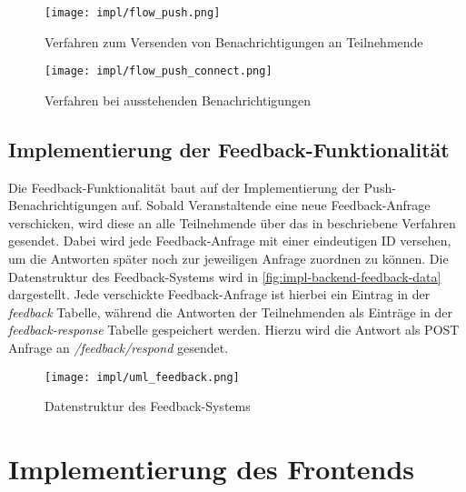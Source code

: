\begin{figure}[htpb]
    \centering
    \texttt{[image: impl/flow\_push.png]}
    \caption{Verfahren zum Versenden von Benachrichtigungen an Teilnehmende}
    \label{fig:impl-backend-push}
\end{figure}

\begin{figure}[htpb]
    \centering
    \texttt{[image: impl/flow\_push\_connect.png]}
    \caption{Verfahren bei ausstehenden Benachrichtigungen}
    \label{fig:impl-backend-push-connect}
\end{figure}

\subsection{Implementierung der Feedback-Funktionalität}

Die Feedback-Funktionalität baut auf der Implementierung der
Push-Benachrichtigungen auf. Sobald Veranstaltende eine neue Feedback-Anfrage
verschicken, wird diese an alle Teilnehmende über das in
 beschriebene Verfahren gesendet. Dabei wird
jede Feedback-Anfrage mit einer eindeutigen ID versehen, um die Antworten später
noch zur jeweiligen Anfrage zuordnen zu können. Die Datenstruktur des
Feedback-Systems wird in \autoref{fig:impl-backend-feedback-data} dargestellt.
Jede verschickte Feedback-Anfrage ist hierbei ein Eintrag in der
\textit{feedback} Tabelle, während die Antworten der Teilnehmenden als Einträge
in der \textit{feedback-response} Tabelle gespeichert werden. Hierzu wird die
Antwort als POST Anfrage an \textit{/feedback/respond} gesendet.

\begin{figure}[htpb]
    \centering
    \texttt{[image: impl/uml\_feedback.png]}
    \caption{Datenstruktur des Feedback-Systems}
    \label{fig:impl-backend-feedback-data}
\end{figure}



\section{Implementierung des Frontends}

